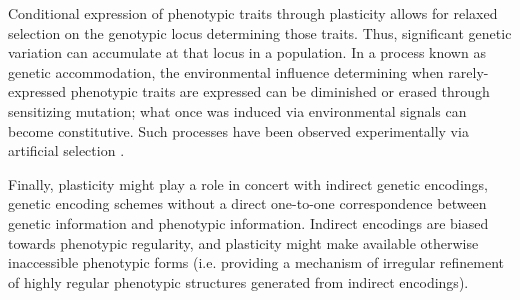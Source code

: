 Conditional expression of phenotypic traits through plasticity allows for relaxed selection on the genotypic locus determining those traits. Thus, significant genetic variation can accumulate at that locus in a population. In a process known as genetic accommodation, the environmental influence determining when rarely-expressed phenotypic traits are expressed can be diminished or erased through sensitizing mutation; what once was induced via environmental signals can become constitutive. Such processes have been observed experimentally via artificial selection \cite{Moczek2011TheInnovation}.

Finally, plasticity might play a role in concert with indirect genetic encodings, genetic encoding schemes without a direct one-to-one correspondence between genetic information and phenotypic information. Indirect encodings are biased towards phenotypic regularity, \cite{Clune2011OnRegularity} and plasticity might make available otherwise inaccessible phenotypic forms (i.e. providing a mechanism of irregular refinement of highly regular phenotypic structures generated from indirect encodings).
